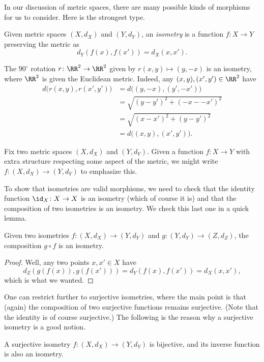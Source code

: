 \documentclass[../notes.tex]{subfiles}
\begin{document}
In our discussion of metric spaces, there are many possible kinds of morphisms for us to consider. Here is the strongest type.
\begin{definition}[Isometry]
	Given metric spaces $(X,d_X)$ and $(Y,d_Y)$, an \textit{isometry} is a function $f\colon X\to Y$ preserving the metric as
	\[d_Y(f(x),f(x'))=d_X(x,x').\]
\end{definition}
\begin{example}
	The $90^\circ$ rotation $r\colon\RR^2\to\RR^2$ given by $r(x,y)\mapsto(y,-x)$ is an isometry, where $\RR^2$ is given the Euclidean metric. Indeed, any $(x,y),(x',y')\in\RR^2$ have
	\begin{align*}
		d\big(r(x,y),r(x',y')\big) &= d\big((y,-x),(y',-x')\big) \\
		&= \sqrt{(y-y')^2+(-x--x')^2} \\
		&= \sqrt{(x-x')^2+(y-y')^2} \\
		&= d\big((x,y),(x',y')\big).
	\end{align*}
\end{example}
\begin{notation}
	Fix two metric spaces $(X,d_X)$ and $(Y,d_Y)$. Given a function $f\colon X\to Y$ with extra structure respecting some aspect of the metric, we might write $f\colon(X,d_X)\to(Y,d_Y)$ to emphasize this.
\end{notation}
To show that isometries are valid morphisms, we need to check that the identity function ${\id_X}\colon X\to X$ is an isometry (which of course it is) and that the composition of two isometries is an isometry. We check this last one in a quick lemma.
\begin{lemma}
	Given two isometries $f\colon(X,d_X)\to(Y,d_Y)$ and $g\colon(Y,d_Y)\to(Z,d_Z)$, the composition $g\circ f$ is an isometry.
\end{lemma}
\begin{proof}
	Well, any two points $x,x'\in X$ have
	\[d_Z(g(f(x)),g(f(x')))=d_Y(f(x),f(x'))=d_X(x,x'),\]
	which is what we wanted.
\end{proof}
One can restrict further to surjective isometries, where the main point is that (again) the composition of two surjective functions remains surjective. (Note that the identity is of course surjective.) The following is the reason why a surjective isometry is a good notion.
\begin{lemma}
	A surjective isometry $f\colon(X,d_X)\to(Y,d_Y)$ is bijective, and its inverse function is also an isometry.
\end{lemma}
\end{document}
